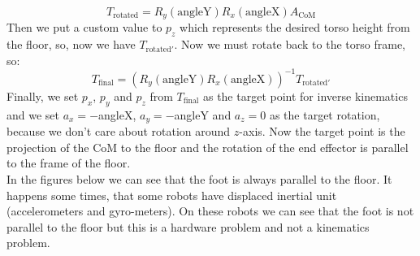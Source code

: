 \[
	T_{\text{rotated}} = R_y(\text{angleY})R_x(\text{angleX})A_{\text{CoM}}
\]
Then we put a custom value to \(p_z\) which represents the desired torso height from the floor, so, now we have \(T_{\text{rotated}'}\). Now we must rotate back to the torso frame, so:
\[
	T_{\text{final}} = \left(R_y(\text{angleY})R_x(\text{angleX})\right)^{-1}T_{\text{rotated}'}
\]
Finally, we set  \(p_x\), \(p_y\) and \(p_z\) from \(T_{\text{final}}\) as the target point for inverse kinematics and we set \(a_x = -\)angleX, \(a_y = -\)angleY and \(a_z = 0\) as the target rotation, because we don't care about rotation around \(z\)-axis. Now the target point is the projection of the CoM to the floor and the rotation of the end effector is parallel to the frame of the floor.\\
In the figures below we can see that the foot is always parallel to the floor. It happens some times, that some robots have displaced inertial unit (accelerometers and gyro-meters). On these robots we can see that the foot is not parallel to the floor but this is a hardware problem and not a kinematics problem.
